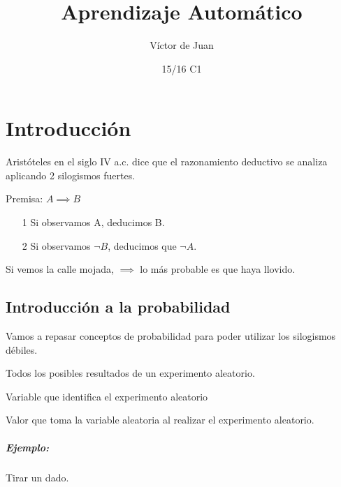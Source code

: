 \documentclass{apuntes}
\title{Aprendizaje Automático}
\author{Víctor de Juan}
\date{15/16 C1}
\begin{document}
\pagestyle{plain}
\maketitle

\tableofcontents
\newpage

\chapter{Introducción}


Aristóteles en el siglo IV a.c. dice que el razonamiento deductivo se analiza aplicando 2 silogismos fuertes.

\begin{defn} Premisa:  $A \implies B$
\begin{itemize}
\item[1] Si observamos A, deducimos B.
\item[2] Si observamos $\neg B$, deducimos que $\neg A$.
\end{itemize}
\end{defn}

\begin{defn}
Si vemos la calle mojada, $\implies$ lo más probable es que haya llovido.
\end{defn}


\section{Introducción a la probabilidad}

Vamos a repasar conceptos de probabilidad para poder utilizar los silogismos débiles.

\begin{defn}[dominio]
Todos los posibles resultados de un experimento aleatorio.
\end{defn}

\begin{defn}
Variable que identifica el experimento aleatorio
\end{defn}

\begin{defn}[Suceso]
Valor que toma la variable aleatoria al realizar el experimento aleatorio.
\end{defn}

\paragraph{Ejemplo:} Tirar un dado.
\end{document}
